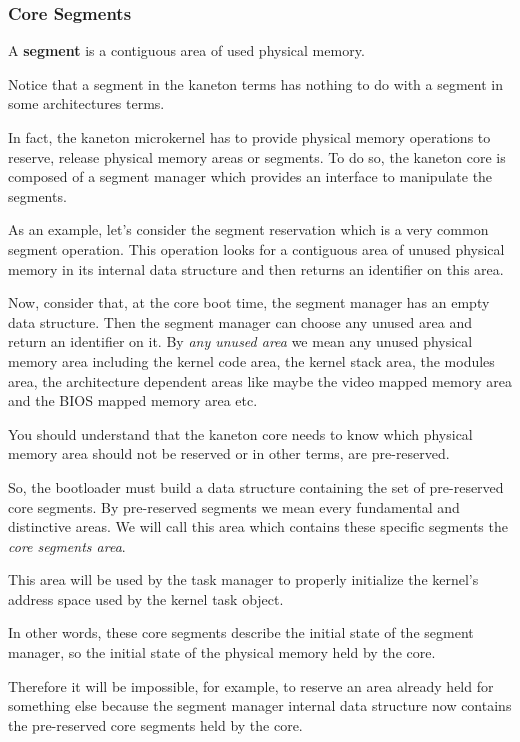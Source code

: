 \subsubsection{Core Segments}

A \textbf{segment} is a contiguous area of used physical memory.

Notice that a segment in the kaneton terms has nothing to do with
a segment in some architectures terms.

In fact, the kaneton microkernel has to provide physical memory operations to
reserve, release physical memory areas or segments. To do so, the kaneton
core is composed of a segment manager which provides an interface to
manipulate the segments.

As an example, let's consider the segment reservation which is a very
common segment operation. This operation looks for a contiguous area
of unused physical memory in its internal data structure and then
returns an identifier on this area.

Now, consider that, at the core boot time, the segment manager has
an empty data structure. Then the segment manager can choose any
unused area and return an identifier on it. By \textit{any unused area} we
mean any unused physical memory area including the kernel code area, the kernel
stack area, the modules area, the architecture dependent areas like maybe the
video mapped memory area and the BIOS mapped memory area etc.

You should understand that the kaneton core needs to know which physical
memory area should not be reserved or in other terms, are pre-reserved.

So, the bootloader must build a data structure containing the set of
pre-reserved core segments. By pre-reserved segments we mean every
fundamental and distinctive areas. We will call this area which
contains these specific segments the \textit{core segments area}.

This area will be used by the task manager to properly initialize
the kernel's address space used by the kernel task object.

In other words, these core segments describe the initial state of the
segment manager, so the initial state of the physical memory held by the
core.

Therefore it will be impossible, for example, to reserve an area
already held for something else because the segment manager internal
data structure now contains the pre-reserved core segments held by the
core.

